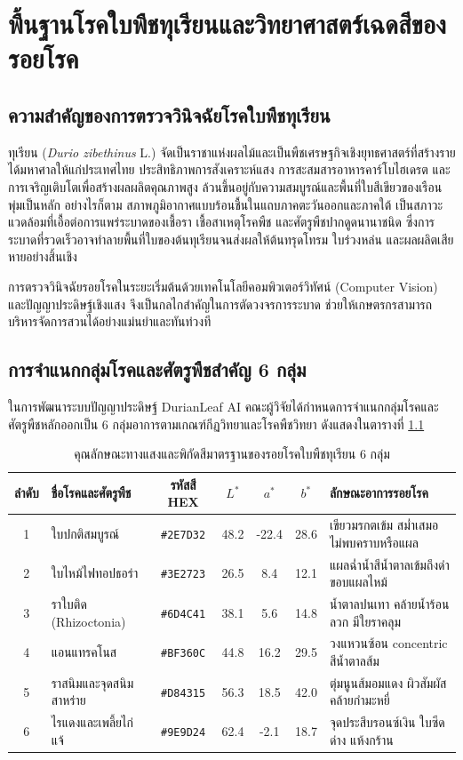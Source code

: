 \chapter{พื้นฐานโรคใบพืชทุเรียนและวิทยาศาสตร์เฉดสีของรอยโรค}

\section{ความสำคัญของการตรวจวินิจฉัยโรคใบพืชทุเรียน}
ทุเรียน (\textit{Durio zibethinus} L.) จัดเป็นราชาแห่งผลไม้และเป็นพืชเศรษฐกิจเชิงยุทธศาสตร์ที่สร้างรายได้มหาศาลให้แก่ประเทศไทย ประสิทธิภาพการสังเคราะห์แสง การสะสมสารอาหารคาร์โบไฮเดรต และการเจริญเติบโตเพื่อสร้างผลผลิตคุณภาพสูง ล้วนขึ้นอยู่กับความสมบูรณ์และพื้นที่ใบสีเขียวของเรือนพุ่มเป็นหลัก อย่างไรก็ตาม สภาพภูมิอากาศแบบร้อนชื้นในแถบภาคตะวันออกและภาคใต้ เป็นสภาวะแวดล้อมที่เอื้อต่อการแพร่ระบาดของเชื้อรา เชื้อสาเหตุโรคพืช และศัตรูพืชปากดูดนานาชนิด ซึ่งการระบาดที่รวดเร็วอาจทำลายพื้นที่ใบของต้นทุเรียนจนส่งผลให้ต้นทรุดโทรม ใบร่วงหล่น และผลผลิตเสียหายอย่างสิ้นเชิง

การตรวจวินิจฉัยรอยโรคในระยะเริ่มต้นด้วยเทคโนโลยีคอมพิวเตอร์วิทัศน์ (Computer Vision) และปัญญาประดิษฐ์เชิงแสง จึงเป็นกลไกสำคัญในการตัดวงจรการระบาด ช่วยให้เกษตรกรสามารถบริหารจัดการสวนได้อย่างแม่นยำและทันท่วงที

\section{การจำแนกกลุ่มโรคและศัตรูพืชสำคัญ 6 กลุ่ม}
ในการพัฒนาระบบปัญญาประดิษฐ์ DurianLeaf AI คณะผู้วิจัยได้กำหนดการจำแนกกลุ่มโรคและศัตรูพืชหลักออกเป็น 6 กลุ่มอาการตามเกณฑ์กีฏวิทยาและโรคพืชวิทยา ดังแสดงในตารางที่ \ref{tab:durian_disease_colorimetry}

\begin{table}[h]
\centering
\caption{คุณลักษณะทางแสงและพิกัดสีมาตรฐานของรอยโรคใบพืชทุเรียน 6 กลุ่ม}
\label{tab:durian_disease_colorimetry}
\small
\begin{tabular}{|c|l|c|c|c|c|l|}
\hline
\textbf{ลำดับ} & \textbf{ชื่อโรคและศัตรูพืช} & \textbf{รหัสสี HEX} & $L^*$ & $a^*$ & $b^*$ & \textbf{ลักษณะอาการรอยโรค} \\
\hline
1 & ใบปกติสมบูรณ์ & \texttt{\#2E7D32} & 48.2 & -22.4 & 28.6 & เขียวมรกตเข้ม สม่ำเสมอ ไม่พบคราบหรือแผล \\
2 & ใบไหม้ไฟทอปธอร่า & \texttt{\#3E2723} & 26.5 & 8.4 & 12.1 & แผลฉ่ำน้ำสีน้ำตาลเข้มถึงดำ ขอบแผลไหม้ \\
3 & ราใบติด (Rhizoctonia) & \texttt{\#6D4C41} & 38.1 & 5.6 & 14.8 & น้ำตาลปนเทา คล้ายน้ำร้อนลวก มีใยราคลุม \\
4 & แอนแทรคโนส & \texttt{\#BF360C} & 44.8 & 16.2 & 29.5 & วงแหวนซ้อน concentric สีน้ำตาลส้ม \\
5 & ราสนิมและจุดสนิมสาหร่าย & \texttt{\#D84315} & 56.3 & 18.5 & 42.0 & ตุ่มนูนส้มอมแดง ผิวสัมผัสคล้ายกำมะหยี่ \\
6 & ไรแดงและเพลี้ยไก่แจ้ & \texttt{\#9E9D24} & 62.4 & -2.1 & 18.7 & จุดประสีบรอนซ์เงิน ใบซีดด่าง แห้งกร้าน \\
\hline
\end{tabular}
\end{table}

